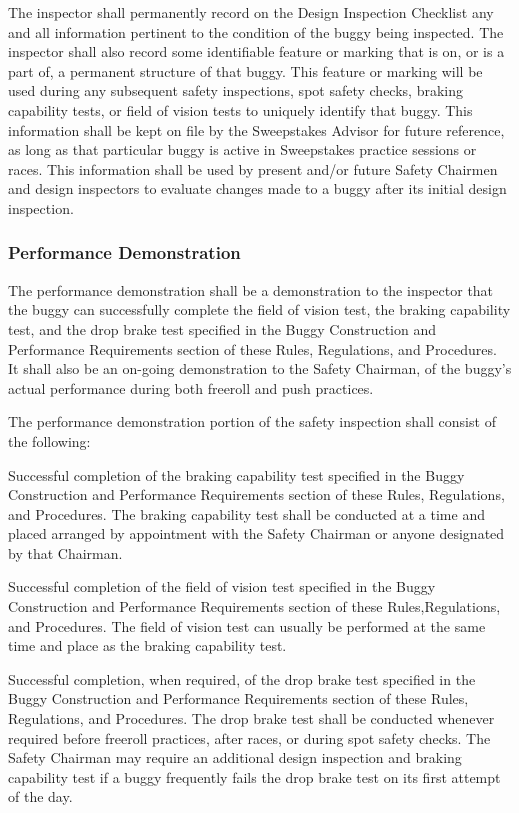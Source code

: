 The inspector shall permanently record on the Design Inspection Checklist any and all information pertinent to the condition of the buggy being inspected. The inspector shall also record some identifiable feature or marking that is on, or is a part of, a permanent structure of that buggy. This feature or marking will be used during any subsequent safety inspections, spot safety checks, braking capability tests, or field of vision tests to uniquely identify that buggy. This information shall be kept on file by the Sweepstakes Advisor for future reference, as long as that particular buggy is active in Sweepstakes practice sessions or races. This information shall be used by present and/or future Safety Chairmen and design inspectors to evaluate changes made to a buggy after its initial design inspection.

\subsubsection{Performance Demonstration}
The performance demonstration shall be a demonstration to the inspector that the buggy can successfully complete the field of vision test, the braking capability test, and the drop brake test specified in the Buggy Construction and Performance Requirements section of these Rules, Regulations, and Procedures. It shall also be an on-going demonstration to the Safety Chairman, of the buggy's actual performance during both freeroll and push practices.

The performance demonstration portion of the safety inspection shall consist of the following:

Successful completion of the braking capability test specified in the Buggy Construction and Performance Requirements section of these Rules, Regulations, and Procedures. The braking capability test shall be conducted at a time and placed arranged by appointment with the Safety Chairman or anyone designated by that Chairman.

Successful completion of the field of vision test specified in the Buggy Construction and Performance Requirements section of these Rules,Regulations, and Procedures. The field of vision test can usually be performed at the same time and place as the braking capability test.

Successful completion, when required, of the drop brake test specified in the Buggy Construction and Performance Requirements section of these Rules, Regulations, and Procedures. The drop brake test shall be conducted whenever required before freeroll practices, after races, or during spot safety checks. The Safety Chairman may require an additional design inspection and braking capability test if a buggy frequently fails the drop brake test on its first attempt of the day.

